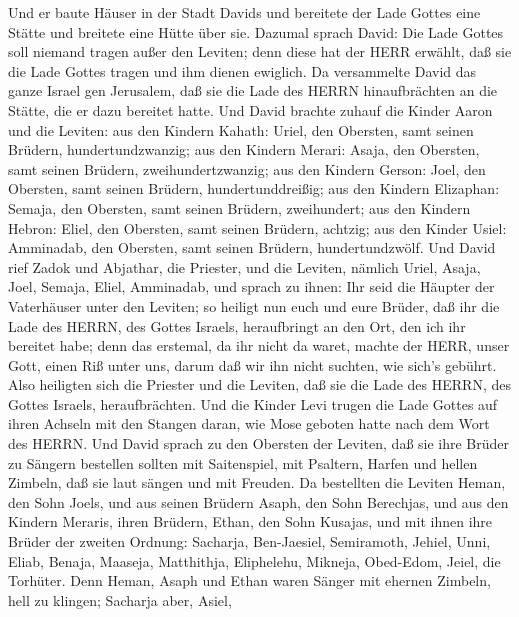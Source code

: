  Und er baute Häuser in der Stadt Davids und bereitete der
Lade Gottes eine Stätte und breitete eine Hütte über sie. 
Dazumal sprach David: Die Lade Gottes soll niemand tragen außer den
Leviten; denn diese hat der HERR erwählt, daß sie die Lade Gottes tragen
und ihm dienen ewiglich.  Da versammelte David das ganze
Israel gen Jerusalem, daß sie die Lade des HERRN hinaufbrächten an die
Stätte, die er dazu bereitet hatte.  Und David brachte
zuhauf die Kinder Aaron und die Leviten:  aus den Kindern
Kahath: Uriel, den Obersten, samt seinen Brüdern, hundertundzwanzig;
 aus den Kindern Merari: Asaja, den Obersten, samt seinen
Brüdern, zweihundertzwanzig;  aus den Kindern Gerson: Joel,
den Obersten, samt seinen Brüdern, hundertunddreißig;  aus
den Kindern Elizaphan: Semaja, den Obersten, samt seinen Brüdern,
zweihundert;  aus den Kindern Hebron: Eliel, den Obersten,
samt seinen Brüdern, achtzig;  aus den Kinder Usiel:
Amminadab, den Obersten, samt seinen Brüdern, hundertundzwölf.
 Und David rief Zadok und Abjathar, die Priester, und die
Leviten, nämlich Uriel, Asaja, Joel, Semaja, Eliel, Amminadab,
 und sprach zu ihnen: Ihr seid die Häupter der Vaterhäuser
unter den Leviten; so heiligt nun euch und eure Brüder, daß ihr die Lade
des HERRN, des Gottes Israels, heraufbringt an den Ort, den ich ihr
bereitet habe;  denn das erstemal, da ihr nicht da waret,
machte der HERR, unser Gott, einen Riß unter uns, darum daß wir ihn
nicht suchten, wie sich's gebührt.  Also heiligten sich die
Priester und die Leviten, daß sie die Lade des HERRN, des Gottes
Israels, heraufbrächten.  Und die Kinder Levi trugen die
Lade Gottes auf ihren Achseln mit den Stangen daran, wie Mose geboten
hatte nach dem Wort des HERRN.  Und David sprach zu den
Obersten der Leviten, daß sie ihre Brüder zu Sängern bestellen sollten
mit Saitenspiel, mit Psaltern, Harfen und hellen Zimbeln, daß sie laut
sängen und mit Freuden.  Da bestellten die Leviten Heman,
den Sohn Joels, und aus seinen Brüdern Asaph, den Sohn Berechjas, und
aus den Kindern Meraris, ihren Brüdern, Ethan, den Sohn Kusajas,
 und mit ihnen ihre Brüder der zweiten Ordnung: Sacharja,
Ben-Jaesiel, Semiramoth, Jehiel, Unni, Eliab, Benaja, Maaseja,
Matthithja, Eliphelehu, Mikneja, Obed-Edom, Jeiel, die Torhüter.
 Denn Heman, Asaph und Ethan waren Sänger mit ehernen
Zimbeln, hell zu klingen;  Sacharja aber, Asiel,
